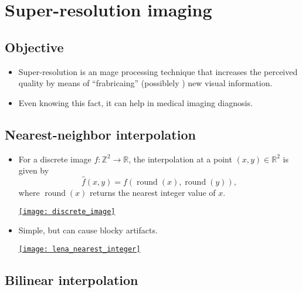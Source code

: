 \chapter{Super-resolution imaging}

\section{Objective}
\begin{itemize}
\item Super-resolution is an mage processing technique that
  increases the perceived quality by means of ``frabricaing''
  (possiblely ) new visual information.
\item Even knowing this fact, it can help in medical imaging
  diagnosis.
\end{itemize}

\section{Nearest-neighbor interpolation}
\begin{itemize}
\item For a discrete image $f: \mathbb{Z}^2 \to \mathbb{R}$, the interpolation at a point 
$(x,y) \in \mathbb{R}^2$ is given by
\begin{equation}
\hat{f}(x,y) = f\!\left( \operatorname{round}(x), \operatorname{round}(y) \right),
\end{equation}
where $\operatorname{round}(x)$ returns the nearest integer value of $x$. 
\vspace{-2.5ex}
\begin{center}
  \href{https://www.mrecacademics.com/DepartmentStudyMaterials/20201220-Digital%20Image%20Processing%20Notes.pdf}{\texttt{[image: discrete\_image]}}
\end{center}
\item Simple, but can cause blocky artifacts.
\begin{center}
  \href{https://github.com/vicente-gonzalez-ruiz/medical_imaging/blob/main/notebooks/nearest_integer_interpolation.ipynb}{\texttt{[image: lena\_nearest\_integer]}}
\end{center}
\end{itemize}

\section{Bilinear interpolation}

